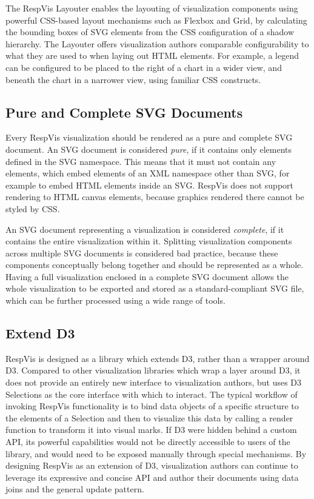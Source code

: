 The RespVis Layouter enables the layouting of visualization
components using powerful CSS-based layout mechanisms such as Flexbox and Grid, by calculating
the bounding boxes of SVG elements from the CSS configuration of a
shadow  hierarchy. The Layouter offers visualization
authors comparable configurability to what they are used to when
laying out HTML elements. For example, a legend can be configured to
be placed to the right of a chart in a wider view, and beneath the
chart in a narrower view, using familiar CSS constructs.





\subsection{Pure and Complete SVG Documents}

Every RespVis visualization should be rendered as a pure and complete
SVG document. An SVG document is considered \emph{pure}, if it
contains only elements defined in the SVG namespace. This means that
it must not contain any  elements, which embed
elements of an XML namespace other than SVG, for example to embed HTML
elements inside an SVG. RespVis does not support rendering to HTML
canvas elements, because graphics rendered there cannot be styled by
CSS.

An SVG document representing a visualization is considered
\emph{complete}, if it contains the entire visualization within
it. Splitting visualization components across multiple SVG documents
is considered bad practice, because these components conceptually
belong together and should be represented as a whole. Having
a full visualization enclosed in a complete SVG document allows the
whole visualization to be exported and stored as a standard-compliant
SVG file, which can be further processed using a wide range of tools.




\subsection{Extend D3}

RespVis is designed as a library which extends D3, rather than a
wrapper around D3. Compared to other visualization libraries which
wrap a layer around D3, it does not provide an entirely new interface
to visualization authors, but uses D3 Selections as the core interface
with which to interact. The typical workflow of invoking RespVis
functionality is to bind data objects of a specific structure to the
elements of a Selection and then to visualize this data by calling a
render function to transform it into visual marks. If D3 were hidden
behind a custom API, its powerful capabilities would not be directly
accessible to users of the library, and would need to be exposed
manually through special mechanisms. By designing RespVis as an
extension of D3, visualization authors can continue to leverage its
expressive and concise API and author their documents using data joins
and the general update pattern.



